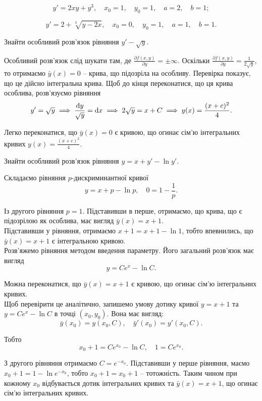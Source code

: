 \begin{problem}
	\[y'=2xy+y^3,\quad x_0=1, \quad y_0=1,\quad a=2,\quad b=1;\]
\end{problem}

\begin{problem}
	\[y'=2+\sqrt[3]{y-2x},\quad x_0=0, \quad y_0=1,\quad a=1,\quad b=1.\]
\end{problem}

\begin{example}
	Знайти особливий розв'язок рівняння $y' - \sqrt{y}$.
\end{example}

\begin{solution}
	Особливий розв'язок слід шукати там, де $\frac{\partial f(x,y)}{\partial y}=\pm\infty$. Оскільки $\frac{\partial f(x,y)}{\partial y}=\frac{1}{2\sqrt{y}}$, то отримаємо $\bar y(x)=0$ -- крива, що підозріла на особливу. Перевірка показує, що це дійсно інтегральна крива. Щоб до кінця переконатися, що ця крива особлива, розв'язуємо рівняння \[y'=\sqrt{y}\implies \frac{\mathop{}\!\mathrm{d} y}{\sqrt{y}}=\mathop{}\!\mathrm{d} x\implies 2\sqrt{y}=x+C\implies y(x)=\frac{(x+c)^2}{4}.\]

	Легко переконатися, що $\bar y(x)=0$ є кривою, що огинає сім'ю інтегральних кривих $y(x)=\frac{(x+c)^2}{4}$. 
\end{solution}

\begin{example}
	Знайти особливий розв'язок рівняння $y = x + y' - \ln y'$.
\end{example}

\begin{solution}
	Складаємо рівняння $p$-дискриминантної кривої \[ y = x + p - \ln p, \quad 0 = 1 - \frac{1}{p}.\]

	 Із другого рівняння $p=1$. Підставивши в перше, отримаємо, що крива, що є підозрілою як особлива, має вигляд $\bar y(x)=x+1$. \\

	Підставивши у рівняння, отримаємо $x + 1=x+1-\ln 1$, тобто впевнились, що $\bar y(x)=x+1$ є інтегральною кривою. \\

	Роз\-в'яж\-е\-мо рівняння методом введення параметру. Його загальний роз\-в'яз\-ок має вигляд \[y=Ce^x-\ln C.\]

	 Можна переконатися, що $\bar y(x)=x+1$ є кривою, що огинає сім'ю інтегральних кривих. \\

	Щоб перевірити це аналітично, запишемо умову дотику кривої $y=x+1$ та $y=Ce^x-\ln C$ в точці $(x_0,y_0)$. Вона має вигляд: \[ \bar y(x_0) = y(x_0, C), \quad \bar{y}'(x_0) = y'(x_0,C).\] 

	Тобто \[x_0+1=Ce^{x_0}-\ln C, \quad 1 = Ce^{x_0}.\]

	З другого рівняння отримаємо $C = e^{-x_0}$. Підставивши у перше рівняння, маємо $x_0 + 1 = 1 - \ln e^{-x_0}$, тобто $x_0+1=x_0+1$ -- тотожність. Таким чином при кожному $x_0$ відбувається дотик інтегральних кривих та $\bar y(x)=x+1$, що огинає сім'ю інтегральних кривих.
\end{solution}


